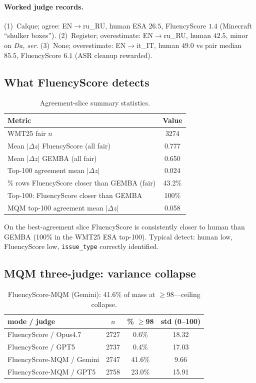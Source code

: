 \documentclass[11pt]{article}
\newcommand{\FS}{FluencyScore}
\begin{document}
\paragraph{Worked judge records.}
(1)~Calque; agree: EN$\to$ru\_RU, human ESA $26.5$, \FS{} $1.4$ (Minecraft
``shulker boxes'').
(2)~Register; overestimate: EN$\to$ru\_RU, human $42.5$, minor on \emph{Da, ser}.
(3)~None; overestimate: EN$\to$it\_IT, human $49.0$ vs pair median $85.5$,
\FS{} $6.1$ (ASR cleanup rewarded).

\subsection{What \FS{} detects}
\label{sec:detects}

\begin{table}[t]
\centering
\scriptsize
\caption{Agreement-slice summary statistics.}
\label{tab:detect}
\begin{tabularx}{\columnwidth}{>{\raggedright\arraybackslash}Xc}
\toprule
Metric & Value \\
\midrule
WMT25 fair $n$ & 3274 \\
Mean $|\Delta z|$ \FS{} (all fair) & 0.777 \\
Mean $|\Delta z|$ GEMBA (all fair) & 0.650 \\
Top-100 agreement mean $|\Delta z|$ & 0.024 \\
\% rows \FS{} closer than GEMBA (fair) & 43.2\% \\
Top-100: \FS{} closer than GEMBA & 100\% \\
MQM top-100 agreement mean $|\Delta z|$ & 0.058 \\
\bottomrule
\end{tabularx}

\end{table}


On the best-agreement slice \FS{} is consistently closer to human than GEMBA
(100\% in the WMT25 ESA top-100).
Typical detect: human low, \FS{} low, \texttt{issue\_type} correctly identified.

\subsection{MQM three-judge: variance collapse}
\label{sec:collapse}

\begin{table}[t]
\centering
\scriptsize
\caption{FluencyScore-MQM (Gemini): 41.6\% of mass at $\ge$98---ceiling collapse.}
\label{tab:collapse}
\begin{tabularx}{\columnwidth}{>{\raggedright\arraybackslash}Xccc}
\toprule
mode / judge & $n$ & \% $\ge$98 & std (0--100) \\
\midrule
\FS{} / Opus4.7 & 2727 & 0.6\% & 18.32 \\
\FS{} / GPT5 & 2737 & 0.4\% & 17.03 \\
\FS{}-MQM / Gemini & 2747 & 41.6\% & 9.66 \\
\FS{}-MQM / GPT5 & 2758 & 23.0\% & 15.91 \\
\bottomrule
\end{tabularx}

\end{table}
\end{document}
